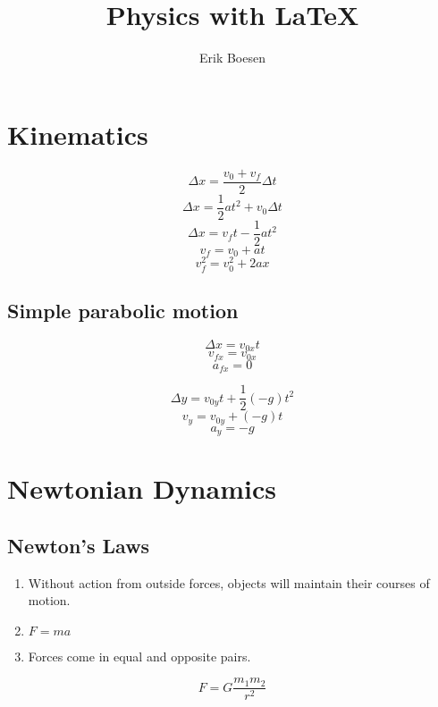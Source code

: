 \documentclass[twocolumn]{article}
\begin{document}
\title{Physics with \LaTeX}
\author{Erik Boesen}
\maketitle

\section*{Kinematics}
$$\Delta x=\frac{v_0+v_f}{2}\Delta t$$
$$\Delta x=\frac{1}{2}at^2+v_0\Delta t$$
$$\Delta x=v_ft-\frac{1}{2}at^2$$
$$v_f=v_0+at$$
$$v_f^2=v_0^2+2ax$$
\subsection*{Simple parabolic motion}
$$\Delta x=v_{0x}t$$
$$v_{fx}=v_{0x}$$
$$a_{fx}=0$$

$$\Delta y=v_{0y}t+\frac{1}{2}(-g)t^2$$
$$v_{y}=v_{0y}+(-g)t$$
$$a_{y}=-g$$

\section*{Newtonian Dynamics}
\subsection*{Newton's Laws}
\begin{enumerate}
  \item{Without action from outside forces, objects will maintain their courses of motion.}
  \item{$F=ma$}
  \item{Forces come in equal and opposite pairs.}
\end{enumerate}
$$F=G\frac{m_1m_2}{r^2}$$
\end{document}
